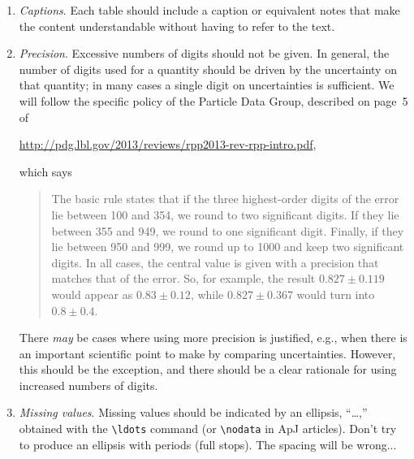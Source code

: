 \documentclass[letterpaper,11pt]{article}
\begin{document}
\begin{enumerate}

\item{\it Captions\/}.  Each table should include a caption or equivalent notes that make the content understandable without having to refer to the text.

\item {\it Precision\/}. Excessive numbers of digits should not be given.  In general, the number
of digits used for a quantity should be driven by the uncertainty on that
quantity; in many cases a
single digit on uncertainties is sufficient.  We will follow the specific
policy of the Particle Data Group, described on page~5 of

\url{http://pdg.lbl.gov/2013/reviews/rpp2013-rev-rpp-intro.pdf},

\noindent which says 
\begin{quotation}
\noindent The basic rule states that if the three
highest-order digits of the error lie between 100 and 354, we round to two
significant digits.  If they lie between 355 and 949, we round to one
significant digit.  Finally, if they lie between 950 and 999, we round up to
1000 and keep two significant digits.  In all cases, the central value is given
with a precision that matches that of the error.  So, for example, the result
$0.827\pm0.119$ would appear as $0.83\pm0.12$, while
$0.827\pm0.367$ would turn into $0.8\pm0.4$.
\end{quotation}

There {\it may\/} be cases where using more precision is justified, e.g.,
when there is an important scientific point to make by comparing uncertainties.
However, this should be the exception, and there should be a clear rationale
for using increased numbers of digits.

%

\item {\it Missing values\/}. Missing values should be indicated by an ellipsis, ``\dots,'' obtained
with the \verb|\ldots| command (or \verb|\nodata| in ApJ articles).  Don't try to produce an ellipsis with periods (full
stops).  The spacing will be wrong...


\end{enumerate}
\end{document}
